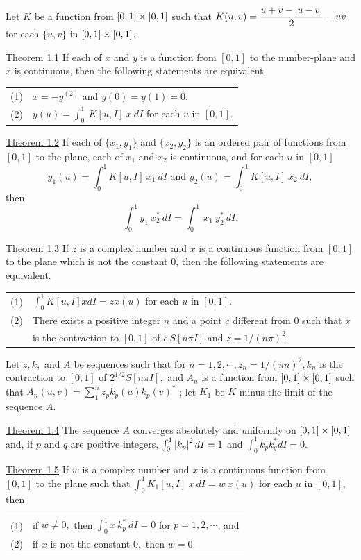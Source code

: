 Let $K$ be a function from $[0,1] \times [0, 1]$ such that $K(u, v) = \dfrac{u + v - \left|u - v\right|}{2} - uv$ for each
$\{u, v \}$ in $[0,1] \times [0, 1]$.\nl

\underline{Theorem 1.1}  If each of $x$ and $y$ is a function from $[0, 1]$ to the number-plane and $x$ is continuous, then the following statements are equivalent.

\begin{tabular}{r l}
(1)& $x = -y^{(2)}$ and $y(0)= y(1)= 0$.\\
(2)&$y(u) = \int_{0}^{1}~K[u,I]~x~dI$ for each $u$ in $[0, 1].$
\end{tabular}\nl

\underline{Theorem 1.2}  If each of $\{x_{1}, y_{1}\}$ and $\{x_{2}, y_{2}\}$ is an ordered pair of functions from $[0, 1]$ to the plane, each of $x_{1}$ and $x_{2}$ is continuous, and for each $u$ in $[0, 1]$\nl
\[y_{1}(u) = \int_{0}^{1}K[u, I]~x_{1}~dI \text{~and~} y_{2}(u) = \int_{0}^{1}K[u, I]~x_{2}~dI,
\]
then
\[\int_{0}^{1}y_{1}~x^{*}_{2}~dI = \int_{0}^{1}~x_{1}~y_{2}^{*}~dI.
\]

\underline{Theorem 1.3}   If $z$ is a complex number and $x$ is a continuous function from $[0, 1]$ to the plane which is not the constant $0$, then the following statements are equivalent.\nl

\begin{tabular}{r l}
(1)& $\int_{0}^{1}K[u, I]x dI = z x(u)$ for each $u$ in $[0, 1]$.\\
(2)& There exists a positive integer $n$ and a point $c$ different from $0$ such that $x$\\
& is the contraction to $[0, 1]$ of $c~S[n\pi I]$ and $z = 1/(n\pi)^{2}.$
\end{tabular}

Let $z, k, $ and $A$ be sequences such that for $n = 1, 2, \cdots  , z_{n} = 1/(\pi n)^{2}, k_{n}$ is the contraction to $[0, 1]$ of $2^{1/2}S[n\pi I],$ and $A_{n}$ is a function from $[0,1] \times [0, 1]$ such that $A_{n}(u, v) = \sum_{1}^{n}z_{p}k_{p}(u)k_{p}(v)^{*}$ ; let $K_{1}$ be $K$ minus the limit of the sequence $A$.\nl

\underline{Theorem 1.4}  The sequence $A$ converges absolutely and uniformly on $[0,1] \times [0, 1]$ and, if $p$ and $q$ are positive integers, $\int_{0}^{1} \left|k_{p}\right|^{2} dI = 1$ and $\int_{0}^{1}k_{p}k_q^{*}dI = 0.$\nl

\underline{Theorem 1.5}  If $w$ is a complex number and $x$ is a continuous function from $[0, 1]$ to the plane such that $\int_{0}^{1} K_{1}[u, I]~x~dI = w~x(u)$ for each $u$ in $[0, 1],$ then \nl
\begin{tabular}{r l}
(1)& if $w \neq 0,$ then $\int_{0}^{1} x~k_{p}^{*}~dI = 0$ for $p = 1, 2, \cdots $, and \\
(2)& if $x$ is not the constant $0,$ then $w = 0.$
\end{tabular}

